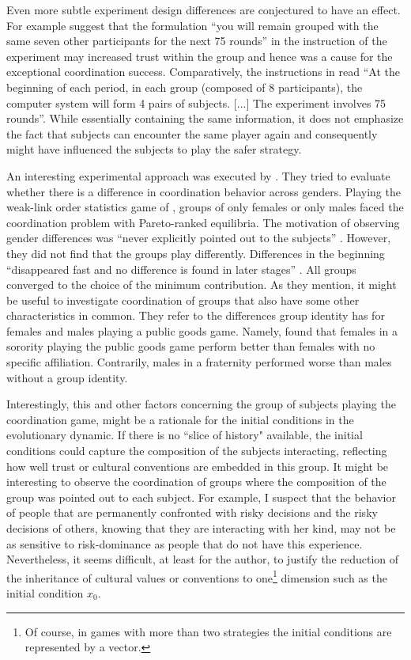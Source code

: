 Even more subtle experiment design differences are conjectured to have an
effect. For example \textcite{devetag_when_2007} suggest that the formulation
``you will remain grouped with the same seven other participants for the next
75 rounds'' in the instruction of the \textcite{rankin_strategic_2000}  
experiment may increased trust within the group and hence was a 
cause for the exceptional coordination success. Comparatively, the 
instructions in \textcite{dubois_optimization_2012} read ``At the beginning
of each period, in each group (composed of 8 participants), the computer
system will form 4 pairs of subjects. [...] The experiment 
involves 75 rounds''\parencite[378]{dubois_optimization_2012}. 
While essentially containing the same information,
it does not emphasize the fact that subjects can encounter the same 
player again and consequently might have influenced the subjects to play
the safer strategy.

An interesting experimental approach was executed by 
\textcite{dufwenberg_gender_2005}. They tried to evaluate whether 
there is a difference in coordination behavior across genders.
Playing the 
weak-link order statistics game of \textcite{van_huyck_tacit_1990}, groups of 
only females or only males faced the coordination problem with Pareto-ranked 
equilibria. The motivation of observing gender differences was 
``never explicitly pointed  out to the subjects'' 
\parencite{dufwenberg_gender_2005}.
However, they did not find that the groups play
differently. Differences in the beginning ``disappeared fast and no difference
is found in later stages'' \parencite[235]{dufwenberg_gender_2005}. 
All groups converged to the choice of the minimum
contribution. As they mention, it might be useful to investigate 
coordination of groups that also have some other 
characteristics in common. They refer to the differences group 
identity has for females and males playing a 
public goods game. Namely, \textcite{croson_groups_2008} found that 
females in a sorority playing the public goods game perform better than 
females with no specific affiliation. Contrarily, males in a fraternity 
performed worse than males without a group identity. 

Interestingly, this and other factors concerning the group of subjects 
playing the coordination game, might be a rationale for the 
initial conditions in the evolutionary dynamic. If there is no 
``slice of history" available,
the initial conditions could capture the composition of the subjects 
interacting, reflecting how well trust or cultural conventions 
are embedded in this group.
It might be interesting to observe the 
coordination of groups where the composition of the group
was pointed out to each subject. 
For example, I suspect that the behavior of people that
are permanently confronted with risky decisions and the risky decisions
of others, knowing that they are interacting with her kind, 
may not be as sensitive to risk-dominance as people that do not
have this experience.
Nevertheless, it seems difficult, at least for the author, to justify
the reduction of the inheritance of cultural values or conventions to 
one\footnote{Of course, in games with more than two strategies 
the initial conditions are represented by a vector.} dimension such 
as the initial condition $x_0$. 
